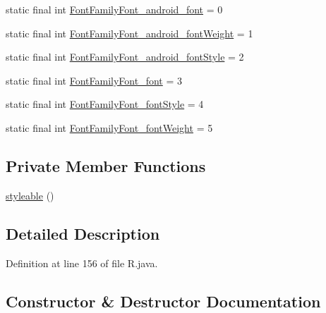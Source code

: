 \begin{DoxyCompactItemize}
\item 
static final int \mbox{\hyperlink{classandroid_1_1support_1_1coreui_1_1_r_1_1styleable_a5b4e5230f0300b428044c705c831e229}{Font\+Family\+Font\+\_\+android\+\_\+font}} = 0
\item 
static final int \mbox{\hyperlink{classandroid_1_1support_1_1coreui_1_1_r_1_1styleable_a4235ce7f856ef81da590807efb328efa}{Font\+Family\+Font\+\_\+android\+\_\+font\+Weight}} = 1
\item 
static final int \mbox{\hyperlink{classandroid_1_1support_1_1coreui_1_1_r_1_1styleable_a96a8c9ce2e75bd5f07b0d8e32f701b4b}{Font\+Family\+Font\+\_\+android\+\_\+font\+Style}} = 2
\item 
static final int \mbox{\hyperlink{classandroid_1_1support_1_1coreui_1_1_r_1_1styleable_ae407c9950ba5dc2011b917f0293d8305}{Font\+Family\+Font\+\_\+font}} = 3
\item 
static final int \mbox{\hyperlink{classandroid_1_1support_1_1coreui_1_1_r_1_1styleable_ad00501b057920e2245914a87490ce333}{Font\+Family\+Font\+\_\+font\+Style}} = 4
\item 
static final int \mbox{\hyperlink{classandroid_1_1support_1_1coreui_1_1_r_1_1styleable_ab902fae1b15d37a55f927de5a8914a7e}{Font\+Family\+Font\+\_\+font\+Weight}} = 5
\end{DoxyCompactItemize}
\subsection*{Private Member Functions}
\begin{DoxyCompactItemize}
\item 
\mbox{\hyperlink{classandroid_1_1support_1_1coreui_1_1_r_1_1styleable_a9b3a3092e3345039786e0cdacf07c6ad}{styleable}} ()
\end{DoxyCompactItemize}


\subsection{Detailed Description}


Definition at line 156 of file R.\+java.



\subsection{Constructor \& Destructor Documentation}
\mbox{\label{classandroid_1_1support_1_1coreui_1_1_r_1_1styleable_a9b3a3092e3345039786e0cdacf07c6ad}} 
